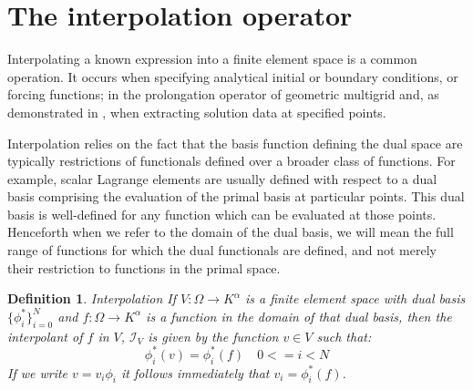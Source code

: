 \documentclass[a4paper,11pt]{article}
\newtheorem{definition}{Definition}[section]
\begin{document}



\section{The interpolation operator}

Interpolating a known expression into a finite element space is a common
operation. It occurs when specifying analytical initial or boundary conditions,
or forcing functions; in the prolongation operator of geometric multigrid and,
as demonstrated in \parencite{nixon-hill_2024}, when extracting solution data
at specified points.

Interpolation relies on the fact that the basis function defining the dual
space are typically restrictions of functionals defined over a broader class of
functions. For example, scalar Lagrange elements are usually defined with
respect to a dual basis comprising the evaluation of the primal basis at
particular points. This dual basis is well-defined for any function which can
be evaluated at those points. Henceforth when we refer to the domain of the
dual basis, we will mean the full range of functions for which the dual
functionals are defined, and not merely their restriction to functions in the
primal space.

\begin{definition}{Interpolation}
    If $V: \Omega \rightarrow K^\alpha$ is a finite element space with dual
    basis $\{\phi^*_i\}_{i=0}^{N}$ and $f:\Omega \rightarrow K^\alpha$ is a
    function in the domain of that dual basis, then the interpolant of $f$ in
    $V$, $\mathcal{I}_V$ is given by the function $v\in V$ such that:
    \begin{equation}
         \phi^*_i(v) = \phi^*_i(f) \quad 0<=i<N
    \end{equation}
    If we write $v=v_i\phi_i$ it follows immediately that $v_i = \phi^*_i(f)$.
\end{definition}
\end{document}
